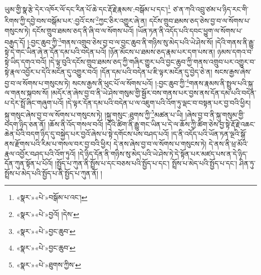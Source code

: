 ཡུམ་གྱི་སྣ་རྩེ་དེར་འཁོར་ལོ་དང་རིན་པོ་ཆེ་དང་རྡོ་རྗེ་རྣམས་:བསྒོམ་པ་དང་།\footnote{«སྣར་»«པེ་»བསྒོམ་པ་འང་།} ཙ་ན་ཀའི་འབྲུ་ཙམ་པ་ཉིད་རང་གི་རིགས་ཀྱི་དབྱེ་བས་བསྒོམ་པར་:བྱའོ་ངས་\footnote{«སྣར་»«པེ་»བྱའོ། །དེས་}ཀྱང་ཅིར་འགྱུར་ཞེ་ན། དངོས་གྲུབ་ཐམས་ཅད་ཅེས་བྱ་བ་ལ་སོགས་པ་གསུངས་ཏེ། དངོས་གྲུབ་ཐམས་ཅད་ནི་ཞི་བ་ལ་སོགས་པའོ། །ཡོན་ཏན་ནི་འདོད་པའི་དབང་ཕྱུག་ལ་སོགས་པ་བརྒྱད་དོ། །:བྱང་ཆུབ་ཀྱི་\footnote{«སྣར་»«པེ་»བྱང་ཆུབ་}གནས་འགྲུབ་ཅེས་བྱ་བ་ལ་བྱང་ཆུབ་ནི་གཉིས་སུ་མེད་པའི་ཡེ་ཤེས་སོ། །དེའི་གནས་ནི་རྒྱུ་སྟེ་དེ་གང་ཡིན་ཞེ་ན་དོན་དམ་པའི་བདེན་པའོ། །ཉོན་མོངས་པ་ཐམས་ཅད་རྣམ་པར་དག་པས་ན། ཉམས་དགའ་བ་སྟེ་ཡིད་དགའ་བའོ། །དེ་ལྟ་བུའི་དངོས་གྲུབ་ཐམས་ཅད་ཀྱི་གཞིར་གྱུར་པའི་བྱང་ཆུབ་ཀྱི་གནས་འགྲུབ་པར་འགྱུར་བ་སྟེ་རྣལ་འབྱོར་པ་དེའི་མངོན་དུ་འགྱུར་བའོ། །དོན་དམ་པའི་བདེན་པ་ཇི་ལྟར་མངོན་དུ་བྱེད་ཅེ་ན། སངས་རྒྱས་ཞེས་བྱ་བ་ལ་སོགས་པ་གསུངས་ཏེ། སངས་རྒྱས་ནི་ཕུང་པོ་ལ་སོགས་པའོ། །:བྱང་ཆུབ་ཀྱི་\footnote{«སྣར་»«པེ་»བྱང་ཆུབ་}གནས་རྣམས་ནི་སྤྲུལ་པའི་སྐུ་ལ་གནས་སྐབས་སོ། །མདོར་ན་ཞེས་བྱ་བ་ནི་ཡེ་ཤེས་གསུམ་གྱི་སྦྱོར་བས་གནས་པར་བྱས་ནས་དོན་དམ་པའི་བདེན་པ་དེར་སྤྲོ་ཞིང་གཞུག་པའོ། །དེ་ལྟར་དོན་དམ་པའི་བདེན་པ་ལ་འཇུག་པའི་འོག་ཏུ་ལྡང་བ་བསྟན་པར་བྱ་བའི་ཕྱིར། སྐུ་གསུང་ཞེས་བྱ་བ་ལ་སོགས་པ་གསུངས་ཏེ། །སྐུ་གསུང་:ཐུགས་ཀྱི་\footnote{«སྣར་»«པེ་»ཐུགས་ཀྱིས་}མཚན་པ་ཡི། །ཞེས་བྱ་བ་ནི་སྐུ་གསུམ་གྱི་བདག་ཉིད་ཅན་ནོ། །ཆོས་ནི་འོད་གསལ་བའོ། །དེའི་ཚིག་ནི་རྒྱུ་གང་ཡིན་པ་དེ་ལ་ཆོས་ཀྱི་ཚིག་ཅེས་བྱ་སྟེ་རྡོ་རྗེ་འཆང་ཆེན་པོའི་བདག་ཉིད་དུ་བསྐྱེད་པར་བྱའོ་ཞེས་པ་སྟེ་དགོངས་པས་བཤད་པའོ། །ད་ནི་འདོད་པའི་ཡོན་ཏན་ལྔའི་སྒོ་ནས་རྫོགས་པའི་རིམ་པ་གསལ་བར་བྱ་བའི་ཕྱིར། དེ་ནས་ཞེས་བྱ་བ་ལ་སོགས་པ་གསུངས་ཏེ། དེ་ནས་ནི་ཕྲ་མོའི་རྣལ་འབྱོར་བཤད་པའི་འོག་ཏུའོ། །དེ་ཉིད་དོན་ནི་གཉིས་སུ་མེད་པའི་ཡེ་ཤེས་ཏེ་དེ་སྟོན་པར་མཛད་པས་ན་དེ་ཉིད་དོན་ཀུན་སྟོན་པ་པོའོ། །སྤྱོད་པ་ཀུན་ནི་སྤྲོས་པ་དང་བཅས་པའི་སྤྱོད་པ་དང་། སྤྲོས་པ་མེད་པའི་སྤྱོད་པ་དང་། ཤིན་ཏུ་སྤྲོས་པ་མེད་པའི་སྤྱོད་པ་ནི་སྤྱོད་པ་ཀུན་ནོ། །

